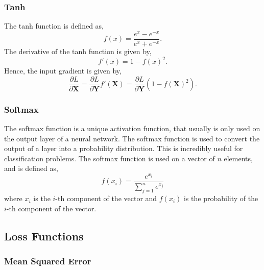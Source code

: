 \documentclass[twocolumn,pra,floatfix]{revtex4-2}
\begin{document}
            \subsubsection{Tanh}

                The tanh function is defined as,
                \begin{equation}
                    f(x) = \frac{e^x - e^{-x}}{e^x + e^{-x}}.
                \end{equation}
                The derivative of the tanh function is given by,
                \begin{equation}
                    f'(x) = 1 - f(x)^2.
                \end{equation} 
                Hence, the input gradient is given by,
                \begin{equation}
                    \frac{\partial L}{\partial \mathbf{X}} = 
                    \frac{\partial L}{\partial \mathbf{Y}} f'(\mathbf{X}) = 
                    \frac{\partial L}{\partial \mathbf{Y}} (1 - f(\mathbf{X})^2).
                \end{equation}
                
            \subsubsection{Softmax}\label{softmax}

                The softmax function is a unique activation function, that usually is only used on the output layer of a neural network. The softmax function is used to convert the output of a layer into a probability distribution. This is incredibly useful for classification problems. The softmax function is used on a vector of $n$ elements, and is defined as,
                \begin{equation}
                    f(x_i) = \frac{e^{x_i}}{\sum_{j=1}^{n} e^{x_j}}
                \end{equation}
                where $x_i$ is the $i$-th component of the vector and $f(x_i)$ is the probability of the $i$-th component of the vector.
                
        \subsection{Loss Functions}
        
            \subsubsection{Mean Squared Error}
            
\end{document}
